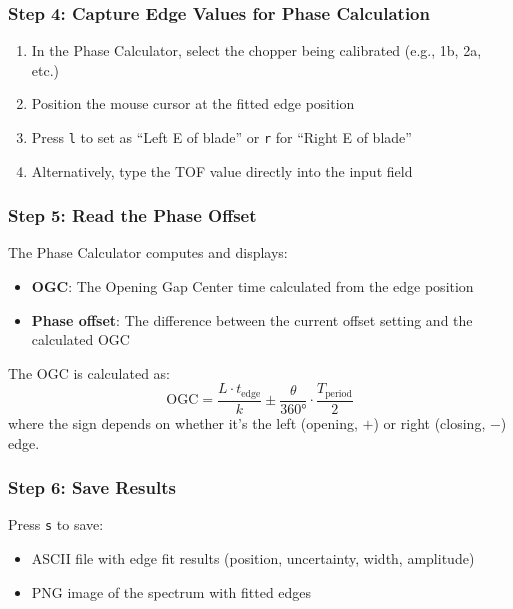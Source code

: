 \documentclass[11pt,letterpaper]{article}
\begin{document}
\subsubsection{Step 4: Capture Edge Values for Phase Calculation}

\begin{enumerate}
    \item In the Phase Calculator, select the chopper being calibrated (e.g., 1b, 2a, etc.)
    \item Position the mouse cursor at the fitted edge position
    \item Press \texttt{l} to set as ``Left E of blade'' or \texttt{r} for ``Right E of blade''
    \item Alternatively, type the TOF value directly into the input field
\end{enumerate}

\subsubsection{Step 5: Read the Phase Offset}

The Phase Calculator computes and displays:
\begin{itemize}
    \item \textbf{OGC}: The Opening Gap Center time calculated from the edge position
    \item \textbf{Phase offset}: The difference between the current offset setting and the 
    calculated OGC
\end{itemize}

The OGC is calculated as:
\begin{equation}
    \text{OGC} = \frac{L \cdot t_{\text{edge}}}{k} \pm \frac{\theta}{360°} \cdot \frac{T_{\text{period}}}{2}
\end{equation}
where the sign depends on whether it's the left (opening, $+$) or right (closing, $-$) edge.

\subsubsection{Step 6: Save Results}

Press \texttt{s} to save:
\begin{itemize}
    \item ASCII file with edge fit results (position, uncertainty, width, amplitude)
    \item PNG image of the spectrum with fitted edges
\end{itemize}
\end{document}
